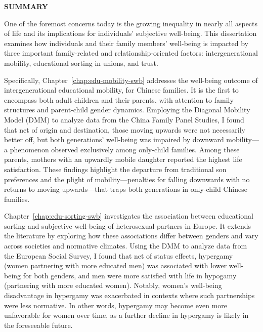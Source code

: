 \begin{center}
    {\large \textbf{SUMMARY}}
\end{center}

\thispagestyle{plain}

One of the foremost concerns today is the growing inequality in nearly all aspects of life and its implications for individuals' subjective well-being. This dissertation examines how individuals and their family members' well-being is impacted by three important family-related and relationship-oriented factors: intergenerational mobility, educational sorting in unions, and trust.

Specifically, Chapter~\ref{chap:edu-mobility-swb} addresses the well-being outcome of intergenerational educational mobility, for Chinese families. It is the first to encompass both adult children and their parents, with attention to family structures and parent-child gender dynamics. Employing the Diagonal Mobility Model (DMM) to analyze data from the China Family Panel Studies, I found that net of origin and destination, those moving upwards were not necessarily better off, but both generations' well-being was impaired by downward mobility—a phenomenon observed exclusively among only-child families. Among these parents, mothers with an upwardly mobile daughter reported the highest life satisfaction. These findings highlight the departure from traditional son preferences and the plight of mobility—penalties for falling downwards with no returns to moving upwards—that traps both generations in only-child Chinese families.

Chapter~\ref{chap:edu-sorting-swb} investigates the association between educational sorting and subjective well-being of heterosexual partners in Europe. It extends the literature by exploring how these associations differ between genders and vary across societies and normative climates. Using the DMM to analyze data from the European Social Survey, I found that net of status effects, hypergamy (women partnering with more educated men) was associated with lower well-being for both genders, and men were more satisfied with life in hypogamy (partnering with more educated women). Notably, women's well-being disadvantage in hypergamy was exacerbated in contexts where such partnerships were less normative. In other words, hypergamy may become even more unfavorable for women over time, as a further decline in hypergamy is likely in the foreseeable future.

